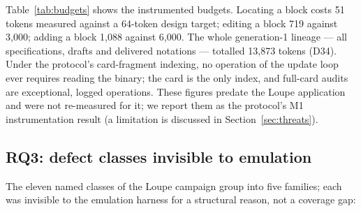 \documentclass[11pt,a4paper]{article}
\begin{document}
Table~\ref{tab:budgets} shows the instrumented budgets. Locating a block
costs 51 tokens measured against a 64-token design target; editing a
block 719 against 3{,}000; adding a block 1{,}088 against 6{,}000. The
whole generation-1 lineage --- all specifications, drafts and delivered
notations --- totalled 13{,}873 tokens (D34). Under the protocol's
card-fragment indexing, no operation of the update loop ever requires
reading the binary; the card is the only index, and full-card audits are
exceptional, logged operations. These figures predate the Loupe
application and were not re-measured for it; we report them as the
protocol's M1 instrumentation result (a limitation is discussed in
Section~\ref{sec:threats}).

\subsection{RQ3: defect classes invisible to emulation}\label{sec:rq3}

The eleven named classes of the Loupe campaign group into five families;
each was invisible to the emulation harness for a structural reason, not
a coverage gap:
\end{document}
